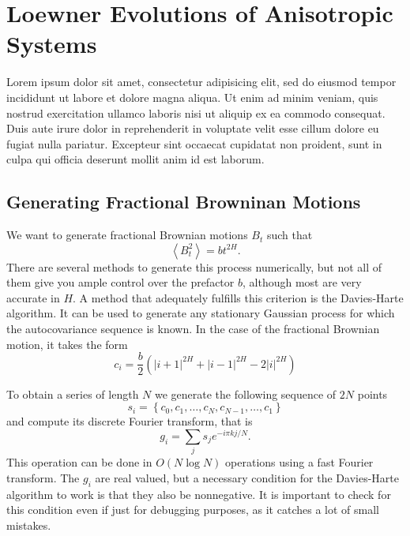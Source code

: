 \chapter{Loewner Evolutions of Anisotropic Systems}
\label{ch6-asle}

Lorem ipsum dolor sit amet, consectetur adipisicing elit, sed do eiusmod tempor
incididunt ut labore et dolore magna aliqua. Ut enim ad minim veniam, quis
nostrud exercitation ullamco laboris nisi ut aliquip ex ea commodo consequat.
Duis aute irure dolor in reprehenderit in voluptate velit esse cillum dolore eu
fugiat nulla pariatur. Excepteur sint occaecat cupidatat non proident, sunt in
culpa qui officia deserunt mollit anim id est laborum.

\section{Generating Fractional Browninan Motions}
\label{sec:fbm}

We want to generate fractional Brownian motions $B_t$ such that
\begin{equation}
    \label{eq:fbm}
    \left\langle B_t^2 \right\rangle = bt^{2H}.
\end{equation}
There are several methods to generate this process numerically, but not all of
them give you ample control over the prefactor $b$, although most are very
accurate in $H$. A method that adequately fulfills this criterion is the
Davies-Harte algorithm. It can be used to generate any stationary Gaussian
process for which the autocovariance sequence is known. In the case of
the fractional Brownian motion, it takes the form
\begin{equation}
    c_i = \frac{b}{2} \left(
            \left|i+1\right|^{2H} +
            \left|i-1\right|^{2H} -
            2\left|i\right|^{2H}
          \right)
\end{equation}

To obtain a series of length $N$ we generate the following sequence of $2N$
points
\begin{equation}
    s_i=\left\{c_{0},c_{1},\ldots,c_{N},c_{N-1},\ldots,c_{1}\right\}
\end{equation}
and compute its discrete Fourier transform, that is
\begin{equation}
    g_{i}=\sum_{j}s_{j}e^{-i\pi kj/N}.
\end{equation}
This operation can be done in $O(N\log N)$ operations using a fast Fourier
transform. The $g_i$ are real valued, but a necessary condition for the
Davies-Harte algorithm to work is that they also be nonnegative. It is
important to check for this condition even if just for debugging purposes,
as it catches a lot of small mistakes.

